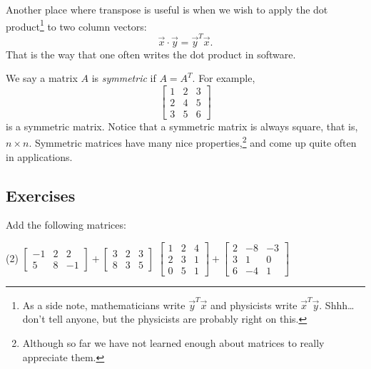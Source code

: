 Another place where transpose is useful is when we wish to apply the dot
product\footnote{As a side note, mathematicians
write $\vec{y}^T\vec{x}$ and physicists
write $\vec{x}^T\vec{y}$.  Shhh\ldots don't tell anyone, but the physicists
are probably right on this.}
to two column vectors:
\begin{equation*}
\vec{x} \cdot \vec{y} = \vec{y}^T \vec{x} .
\end{equation*}
That is the way that one often writes the dot product in software.

We say a matrix $A$ is \emph{symmetric}
if $A = A^T$.  For example,
\begin{equation*}
\begin{bmatrix}
1 & 2 & 3 \\
2 & 4 & 5 \\
3 & 5 & 6
\end{bmatrix}
\end{equation*}
is a symmetric matrix.  Notice that a symmetric matrix is always
square, that is, $n \times n$.  Symmetric matrices
have many nice properties,\footnote{Although so far we have not learned
enough about matrices to really appreciate them.}
and come up quite often in applications.

\subsection{Exercises}

\begin{exercise}
Add the following matrices:
\begin{tasks}(2)
\task
$\begin{bmatrix}
-1 & 2 & 2 \\
5 & 8 & -1
\end{bmatrix}
+
\begin{bmatrix}
3 & 2 & 3 \\
8 & 3 & 5
\end{bmatrix}$
\task
$\begin{bmatrix}
1 & 2 & 4 \\
2 & 3 & 1 \\
0 & 5 & 1
\end{bmatrix}
+
\begin{bmatrix}
2 & -8 & -3 \\
3 & 1 & 0 \\
6 & -4 & 1
\end{bmatrix}$
\end{tasks}
\end{exercise}

